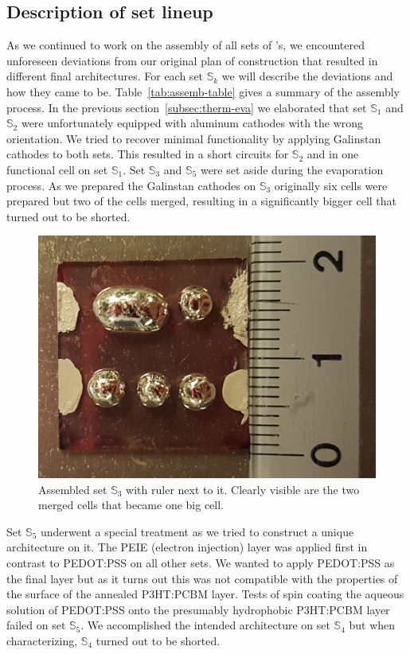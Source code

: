 \clearpage
\twocolumn

\subsection{Description of set lineup}
As we continued to work on the assembly of all sets of \BHSC's, we encountered unforeseen deviations from our original plan of construction that resulted in different final architectures. For each set $\mathbb{S}_k$ we will describe the deviations and how they came to be. Table~\ref{tab:assemb-table} gives a summary of the assembly process.\mypar
In the previous section~\ref{subsec:therm-eva} we elaborated that set $\mathbb{S}_1$ and $\mathbb{S}_2$ were unfortunately equipped with aluminum cathodes with the wrong orientation. We tried to recover minimal functionality by applying Galinstan cathodes to both sets. This resulted in a short circuits for $\mathbb{S}_2$ and in one functional cell on set $\mathbb{S}_1$.\mypar
Set $\mathbb{S}_3$ and $\mathbb{S}_5$ were set aside during the evaporation process. As we prepared the Galinstan cathodes on $\mathbb{S}_3$ originally six cells were prepared but two of the cells merged, resulting in a significantly bigger cell that turned out to be shorted.

\begin{figure}[h]\centering
\includegraphics[width=0.9\columnwidth]{../1_Pictures/cell3.png}
\caption{Assembled set $\mathbb{S}_3$ with ruler next to it. Clearly visible are the two merged cells that became one big cell.}
\label{fig:realblob2}
\end{figure}
Set $\mathbb{S}_5$ underwent a special treatment as we tried to construct a unique architecture on it. The PEIE (electron injection) layer was applied first in contrast to PEDOT:PSS on all other sets. We wanted to apply PEDOT:PSS as the final layer but as it turns out this was not compatible with the properties of the surface of the annealed P3HT:PCBM layer. Tests of spin coating the aqueous solution of PEDOT:PSS onto the presumably hydrophobic P3HT:PCBM layer failed on set $\mathbb{S}_5$.\mypar
We accomplished the intended architecture on set $\mathbb{S}_4$ but when characterizing, $\mathbb{S}_4$ turned out to be shorted.
